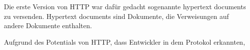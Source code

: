 Die erste Version von HTTP war dafür gedacht sogenannte hypertext documents zu versenden. Hypertext documents sind Dokumente, die Verweisungen auf andere Dokumente enthalten.

Aufgrund des Potentials von HTTP, dass Entwickler in dem Protokol erkannten,